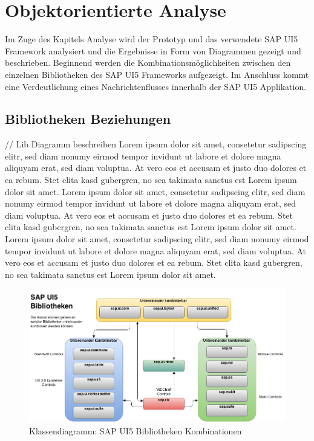 \section{Objektorientierte Analyse}\label{analyse}
Im Zuge des Kapitels Analyse wird der Prototyp und das verwendete SAP UI5 Framework analysiert und die Ergebnisse in Form von Diagrammen gezeigt und beschrieben. Beginnend werden die Kombinationsmöglichkeiten zwischen den einzelnen Bibliotheken des SAP UI5 Frameworks aufgezeigt. Im Anschluss kommt eine Verdeutlichung eines Nachrichtenflusses innerhalb der SAP UI5 Applikation.

\subsection{Bibliotheken Beziehungen}
// Lib Diagramm beschreiben
Lorem ipsum dolor sit amet, consetetur sadipscing elitr, sed diam nonumy eirmod tempor invidunt ut labore et dolore magna aliquyam erat, sed diam voluptua. At vero eos et accusam et justo duo dolores et ea rebum. Stet clita kasd gubergren, no sea takimata sanctus est Lorem ipsum dolor sit amet. Lorem ipsum dolor sit amet, consetetur sadipscing elitr, sed diam nonumy eirmod tempor invidunt ut labore et dolore magna aliquyam erat, sed diam voluptua. At vero eos et accusam et justo duo dolores et ea rebum. Stet clita kasd gubergren, no sea takimata sanctus est Lorem ipsum dolor sit amet. Lorem ipsum dolor sit amet, consetetur sadipscing elitr, sed diam nonumy eirmod tempor invidunt ut labore et dolore magna aliquyam erat, sed diam voluptua. At vero eos et accusam et justo duo dolores et ea rebum. Stet clita kasd gubergren, no sea takimata sanctus est Lorem ipsum dolor sit amet. 

\vspace{1em}
\begin{figure}[htb]
  \centering
  \includegraphics[width=1\linewidth]{abb/sapui5_lib_connections}
  \caption[Klassendiagramm: SAP UI5 Bibliotheken Kombinationen]{Klassendiagramm: SAP UI5 Bibliotheken Kombinationen}
  \label{fig:sapui5libconnections}
\end{figure}


